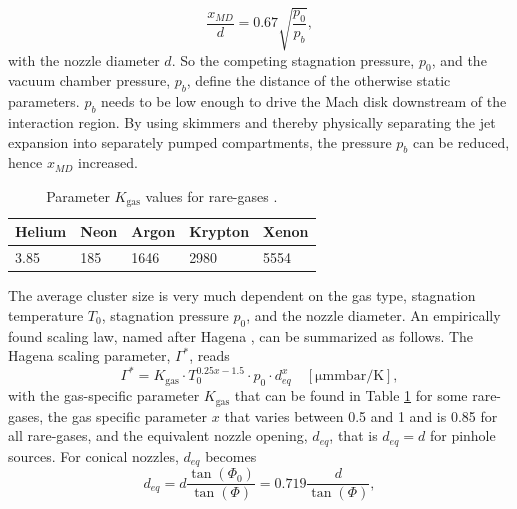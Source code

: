 \begin{equation}
\frac{x_{MD}}{d}=0.67\sqrt{\frac{p_{0}}{p_{b}}},
\label{eq:distance-of-mach-disk}
\end{equation}
with the nozzle diameter $d$. So the competing stagnation pressure, $p_{0}$, and the vacuum chamber pressure, $p_{b}$, define the distance of the otherwise static parameters. $p_{b}$ needs to be low enough to drive the Mach disk downstream of the interaction region. By using skimmers and thereby physically separating the jet expansion into separately pumped compartments, the pressure $p_{b}$ can be reduced, hence $x_{MD}$ increased.\\[1\baselineskip]
%
\begin{table}
	\centering
		\begin{tabular}{ | l | l | l | l | l | }
			\hline
			Helium & Neon & Argon & Krypton & Xenon \\ \hline
			3.85 & 185 & 1646 & 2980 & 5554 \\ \hline
		\end{tabular}
	\caption[Parameter $K_{\text{gas}}$ values for rare-gases.]{Parameter $K_{\text{gas}}$ values for rare-gases \citep{Schorb-2012-Thesis}.}
	\label{tab:k-parameter}
\end{table}
The average cluster size is very much dependent on the gas type, stagnation temperature $T_{0}$, stagnation pressure $p_{0}$, and the nozzle diameter. An empirically found scaling law, named after Hagena \citep{Hagena-1972-JCP,Hagena-1981-SurfSci,Hagena-1987-ZeitschriftAMC}, can be summarized as follows. The Hagena scaling parameter, $\Gamma^{*}$, reads
\begin{equation}
\Gamma^{*} = K_{\text{gas}} \cdot T_{0}^{0.25x-1.5} \cdot p_{0} \cdot d_{eq}^{x}\quad \left[\si{\micro\meter\milli\bar\per\kelvin}\right],
\label{eq:Hagena-parameter}
\end{equation}
with the gas-specific parameter $K_{\text{gas}}$ that can be found in Table \ref{tab:k-parameter} for some rare-gases, the gas specific parameter $x$ that varies between 0.5 and 1 and is 0.85 for all rare-gases, and the equivalent nozzle opening, $d_{eq}$, that is $d_{eq}=d$ for pinhole sources. For conical nozzles, $d_{eq}$ becomes \citep{Schorb-2012-Thesis}
\begin{equation}
d_{eq} = d\frac{\tan\left(\Phi_{0}\right)}{\tan\left(\Phi\right)} = 0.719 \frac{d}{\tan\left(\Phi\right)},
\label{eq:equivalent-nozzle-opening}
\end{equation}
